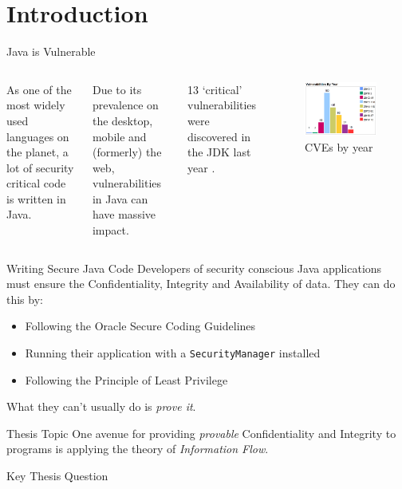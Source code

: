 \section{Introduction}

\begin{frame}{Java is Vulnerable}
	\begin{columns}
			As one of the most widely used languages on the planet, a lot of security critical code is written in Java.\newline
		
			Due to its prevalence on the desktop, mobile and (formerly) the web, vulnerabilities in Java can have massive impact.\newline
			
			13 `critical' vulnerabilities were discovered in the JDK last year \cite{nvd:jdk2016cvss9}.
		\begin{figure}
			\includegraphics[scale=0.25]{content/images/cvedetails_vulnsperyear.png}
			\caption{CVEs by year \cite{cvedetails:jdk2016}}
		\end{figure}
	\end{columns}	
\end{frame}

\begin{frame}{Writing Secure Java Code}
	Developers of security conscious Java applications must ensure the Confidentiality, Integrity and Availability of data. They can do this by:
	
	\begin{itemize}
		\item Following the Oracle Secure Coding Guidelines
		\item Running their application with a \texttt{SecurityManager} installed
		\item Following the Principle of Least Privilege
	\end{itemize}
	
	What they can't usually do is \textit{prove it}.
\end{frame}

\begin{frame}{Thesis Topic}
	One avenue for providing \textit{provable} Confidentiality and Integrity to programs is applying the theory of \textit{Information Flow}.
	\begin{block}{Key Thesis Question}
		
	\end{block}
\end{frame}